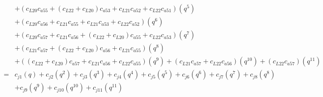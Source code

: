 \documentclass[12pt]{article}
\begin{document}
\begin{align}
    &+ (c_{L20}c_{a55} + (c_{L22} +  c_{L20})c_{a53} + c_{L21}c_{a52} + c_{L22}c_{a51})(q^5) \nonumber\\
    &+ (c_{L20}c_{a56} + c_{L21}c_{a55} + c_{L21}c_{a53} + c_{L22}c_{a52})(q^6) \nonumber\\
    &+ (c_{L20}c_{a57} + c_{L21}c_{a56} + (c_{L22} +  c_{L20})c_{a55} + c_{L22}c_{a53})(q^7) \nonumber\\
    &+ (c_{L21}c_{a57} + (c_{L22} +  c_{L20})c_{a56} + c_{L21}c_{a55})(q^8) \nonumber\\
    &+ ((c_{L22} +  c_{L20})c_{a57} + c_{L21}c_{a56} + c_{L22}c_{a55})(q^9) + (c_{L21}c_{a57} + c_{L22}c_{a56})(q^{10}) + (c_{L22}c_{a57})(q^{11}) \\
    =& c_{j1}(q) + c_{j2}(q^2) + c_{j3}(q^3) + c_{j4}(q^4) + c_{j5}(q^5) + c_{j6}(q^6) + c_{j7}(q^7) + c_{j8}(q^8) \nonumber\\
    &+ c_{j9}(q^9) + c_{j10}(q^{10}) + c_{j11}(q^{11})
\end{align}
\end{document}
